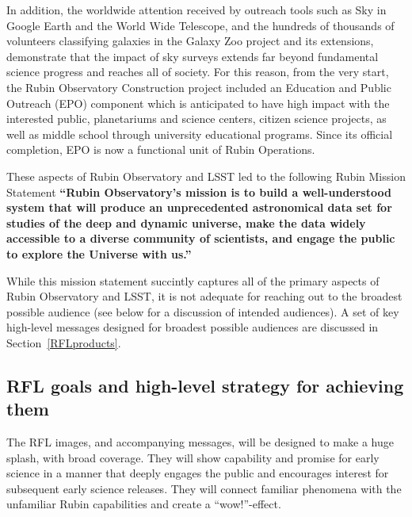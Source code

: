 In addition, the worldwide attention received by outreach tools such as Sky in Google Earth and the World Wide Telescope, and the hundreds of thousands of volunteers classifying galaxies in the Galaxy Zoo project and its extensions, demonstrate that the impact of sky surveys extends far beyond fundamental science progress and reaches all of society. For this reason, from the very start, the Rubin Observatory Construction project included an Education and Public Outreach (EPO) component which is anticipated to have high impact with the interested public, planetariums and science centers, citizen science projects, as well as middle school through university educational programs. 
Since its official completion, EPO is now a functional unit of Rubin Operations.

These aspects of Rubin Observatory and LSST led to the following Rubin Mission Statement {\bf ``Rubin Observatory’s mission is to build a well-understood system that will produce an unprecedented astronomical data set for studies of the deep and dynamic universe, make the data widely accessible to a diverse community of scientists, and engage the public to explore the Universe with us.''}

While this mission statement succintly captures all of the primary aspects of Rubin Observatory and LSST, it is not adequate
for reaching out to the broadest possible audience (see below for a discussion of intended audiences). A set of key high-level
messages designed for broadest possible audiences are discussed in Section~\ref{RFLproducts}.



\subsection{RFL goals and high-level strategy for achieving them}

The RFL images, and accompanying messages, will be designed to make a huge splash, with broad coverage. 
They will show capability and promise for early science in a manner that deeply engages the public and encourages
interest for subsequent early science releases. They will connect familiar phenomena with the unfamiliar Rubin capabilities and create a “wow!”-effect.

